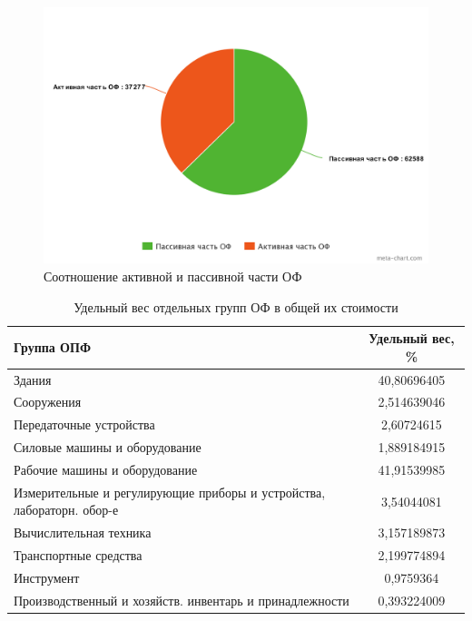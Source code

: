 \begin{figure}[H]
	\centering
	\caption{Соотношение активной и пассивной части ОФ}
	\includegraphics[width=\textwidth]{images/a_p_chart.png}
\end{figure}

\begin{table}[H]
	\caption{Удельный вес отдельных групп ОФ в общей их стоимости}
	\centering
	
	\begin{tabular}{|p{10cm}|c|}
		\hline
		Группа ОПФ & Удельный вес, \% \\ \hline
		Здания & 40,80696405 \\ \hline
		Сооружения & 2,514639046 \\ \hline
		Передаточные устройства & 2,60724615 \\ \hline
		Силовые машины и оборудование & 1,889184915 \\ \hline
		Рабочие  машины и оборудование & 41,91539985 \\ \hline
		Измерительные и регулирующие приборы и устройства, лабораторн. обор-е & 3,54044081 \\ \hline
		Вычислительная техника & 3,157189873 \\ \hline
		Транспортные средства & 2,199774894 \\ \hline
		Инструмент & 0,9759364 \\ \hline
		Производственный и хозяйств. инвентарь и принадлежности & 0,393224009 \\ \hline
	\end{tabular}
\end{table}


